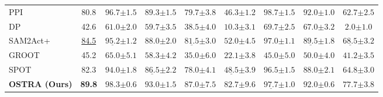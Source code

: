 \begin{table}[htbp]
{\begin{tabular}{l|c|ccccccc}
        PPI~\citep{Yang2025PPI}
        & 80.8
        & $96.7{\scriptscriptstyle\pm 1.5}$
        & $89.3{\scriptscriptstyle\pm 1.5}$
        & $79.7{\scriptscriptstyle\pm 3.8}$
        & $46.3{\scriptscriptstyle\pm 1.2}$
        & $\mathbf{98.7}{\scriptscriptstyle\pm 1.5}$
        & $\mathbf{92.0}{\scriptscriptstyle\pm 1.0}$
        & $62.7{\scriptscriptstyle\pm 2.5}$ \\
        
        DP~\citep{chi2024diffusionpolicy}
        & 42.6
        & $61.0{\scriptscriptstyle\pm 2.0}$
        & $59.7{\scriptscriptstyle\pm 3.5}$
        & $38.5{\scriptscriptstyle\pm 4.0}$
        & $10.3{\scriptscriptstyle\pm 3.1}$
        & $69.7{\scriptscriptstyle\pm 2.5}$
        & $67.0{\scriptscriptstyle\pm 3.2}$
        & $2.0{\scriptscriptstyle\pm 1.0}$ \\
        
        SAM2Act+~\citep{Fang2025SAM2Act} 
        & \underline{84.5} 
        & $\underline{95.2}{\scriptscriptstyle\pm 1.2}$ 
        & $88.0{\scriptscriptstyle\pm 2.0}$ 
        & $\underline{81.5}{\scriptscriptstyle\pm 3.0}$ 
        & $\mathbf{52.0}{\scriptscriptstyle\pm 4.5}$ 
        & $97.0{\scriptscriptstyle\pm 1.1}$ 
        & $\underline{89.5}{\scriptscriptstyle\pm 1.8}$ 
        & $\underline{68.5}{\scriptscriptstyle\pm 3.2}$ \\
        
        GROOT~\citep{zhu2023learning} 
        & 45.2 
        & $65.0{\scriptscriptstyle\pm 5.1}$ 
        & $58.3{\scriptscriptstyle\pm 4.2}$ 
        & $35.0{\scriptscriptstyle\pm 6.0}$ 
        & $22.1{\scriptscriptstyle\pm 3.8}$ 
        & $45.0{\scriptscriptstyle\pm 5.0}$ 
        & $50.0{\scriptscriptstyle\pm 4.0}$ 
        & $41.2{\scriptscriptstyle\pm 3.5}$ \\
        
        SPOT~\citep{Hsu2025SPOT} 
        & 82.3 
        & $94.0{\scriptscriptstyle\pm 1.8}$ 
        & $\underline{86.5}{\scriptscriptstyle\pm 2.2}$  %
        & $78.0{\scriptscriptstyle\pm 4.1}$ 
        & $\underline{48.5}{\scriptscriptstyle\pm 3.9}$ 
        & $96.5{\scriptscriptstyle\pm 1.5}$ 
        & $88.0{\scriptscriptstyle\pm 2.1}$ 
        & $64.8{\scriptscriptstyle\pm 3.0}$ \\
        \midrule
        \rowcolor{tablehead}
        \textbf{OSTRA (Ours)}
        & \textbf{89.8}
        & $\mathbf{98.3}{\scriptscriptstyle\pm 0.6}$
        & $\mathbf{93.0}{\scriptscriptstyle\pm 1.5}$
        & $\mathbf{87.0}{\scriptscriptstyle\pm 7.5}$
        & $\mathbf{82.7}{\scriptscriptstyle\pm 9.6}$
        & $\underline{97.7}{\scriptscriptstyle\pm 1.0}$
        & $\mathbf{92.0}{\scriptscriptstyle\pm 0.6}$
        & $\mathbf{77.7}{\scriptscriptstyle\pm 3.8}$ \\
        \bottomrule
    \end{tabular}%
    }
    \vspace{-6pt}
\end{table}
